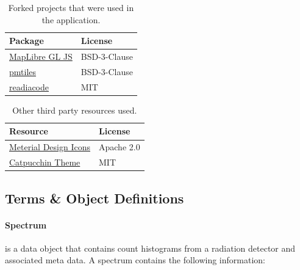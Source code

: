\begin{table}[H]
    \centering
    \caption{Forked projects that were used in the application.}
    \label{tab:forked_packages}
    \begin{tabular}{ll}
        \toprule
        \textbf{Package} & \textbf{License} \\
        \midrule
        \href{https://github.com/maplibre/maplibre-gl-js}{MapLibre GL JS} & BSD-3-Clause \\
        \href{https://github.com/protomaps/PMTiles}{pmtiles} & BSD-3-Clause \\
        \href{https://github.com/cdump/radiacode/tree/master}{readiacode} & MIT \\
        \bottomrule
    \end{tabular}
\end{table}

\begin{table}[H]
    \centering
    \caption{Other third party resources used.}
    \label{tab:third_party_resources}
    \begin{tabular}{ll}
        \toprule
        \textbf{Resource} & \textbf{License} \\
        \midrule
        \href{https://fonts.google.com/icons}{Meterial Design Icons } & Apache 2.0 \\
        \href{https://github.com/catppuccin}{Catpucchin Theme} & MIT \\
        \bottomrule
    \end{tabular}
\end{table}

\subsection{Terms \& Object Definitions}\label{sec:definitions}
\paragraph{Spectrum} is a data object that contains count histograms from a radiation detector and associated meta data. A spectrum contains the following information:

